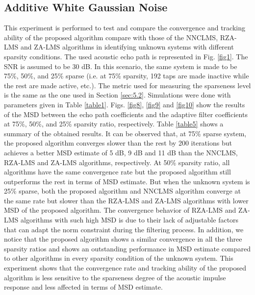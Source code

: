 \vspace{-0.3cm}
\subsection{Additive White Gaussian Noise}\label{sec:5.3.1}
\vspace{-0.5cm}
\noindent This experiment is performed to test and compare the convergence and tracking ability of the proposed algorithm compare with those of the NNCLMS, RZA-LMS and ZA-LMS algorithms in identifying unknown systems with different sparsity conditions. The used acoustic echo path is represented in Fig. \ref{fig1}. The SNR is assumed to be 30 dB. In this scenario, the same system is made to be 75\%, 50\%, and 25\% sparse (i.e. at 75\% sparsity, 192 taps are made inactive while the rest are made active, etc.). The metric used for measuring the sparseness level is the same as the one used in Section \ref{sec:5.2}. Simulations were done with parameters given in Table \ref{table1}. Figs. \ref{fig8}, \ref{fig9} and \ref{fig10} show the results of the MSD between the echo path coefficients and the adaptive filter coefficients at 75\%, 50\%, and 25\% sparsity ratio, respectively. Table \ref{table5} shows a summary of the obtained results. It can be observed that, at 75\% sparse system, the proposed algorithm converges slower than the rest by 200 iterations but achieves a better MSD estimate of 5 dB, 9 dB and 11 dB than the NNCLMS, RZA-LMS and ZA-LMS algorithms, respectively. At 50\% sparsity ratio, all algorithms have the same convergence rate but the proposed algorithm still outperforms the rest in terms of MSD estimate. But when the unknown system is 25\% sparse, both the proposed algorithm and NNCLMS algorithm converge at the same rate but slower than the RZA-LMS and ZA-LMS algorithms with lower MSD of the proposed algorithm. The convergence behavior of RZA-LMS and ZA-LMS algorithms with such high MSD is due to their lack of adjustable factors that can adapt the norm constraint during the filtering process. In addition, we notice that the proposed algorithm shows a similar convergence in all the three sparsity ratios and shows an outstanding performance in MSD estimate compared to other algorithms in every sparsity condition of the unknown system. This experiment shows that the convergence rate and tracking ability of the proposed algorithm is less sensitive to the sparseness degree of the acoustic impulse response and less affected in terms of MSD estimate.

